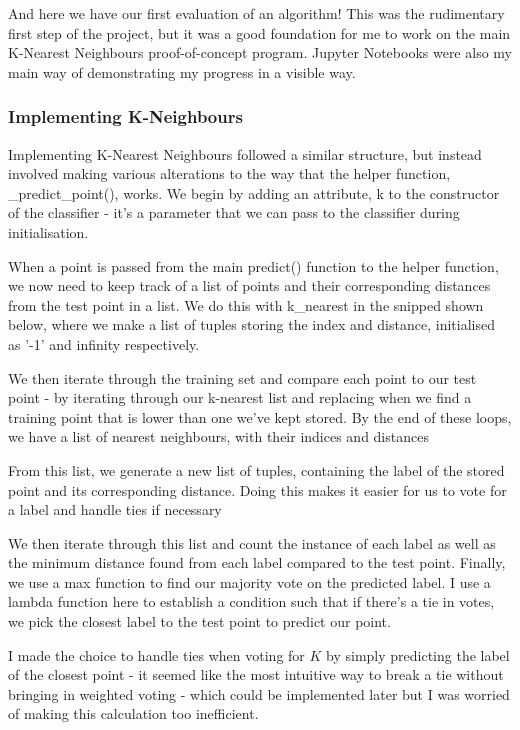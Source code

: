 \documentclass[letterpaper,10pt]{article}
\begin{document}
And here we have our first evaluation of an algorithm! This was the rudimentary first step of the project, but it was a good foundation for me to work on the main K-Nearest Neighbours proof-of-concept program. Jupyter Notebooks were also my main way of demonstrating my progress in a visible way. \par

\subsubsection{Implementing K-Neighbours}
Implementing K-Nearest Neighbours followed a similar structure, but instead involved making various alterations to the way that the helper function, \_predict\_point(), works. We begin by adding an attribute, k to the constructor of the classifier - it's a parameter that we can pass to the classifier during initialisation. \par
When a point is passed from the main predict() function to the helper function, we now need to keep track of a list of points and their corresponding distances from the test point in a list. We do this with k\_nearest in the snipped shown below, where we make a list of tuples storing the index and distance, initialised as '-1' and infinity respectively. \par
We then iterate through the training set and compare each point to our test point - by iterating through our k-nearest list and replacing when we find a training point that is lower than one we've kept stored. By the end of these loops, we have a list of nearest neighbours, with their indices and distances \par
From this list, we generate a new list of tuples, containing the label of the stored point and its corresponding distance. Doing this makes it easier for us to vote for a label and handle ties if necessary \par
We then iterate through this list and count the instance of each label as well as the minimum distance found from each label compared to the test point. Finally, we use a max function to find our majority vote on the predicted label. I use a lambda function here to establish a condition such that if there's a tie in votes, we pick the closest label to the test point to predict our point. \par
I made the choice to handle ties when voting for \(K\) by simply predicting the label of the closest point - it seemed like the most intuitive way to break a tie without bringing in weighted voting - which could be implemented later but I was worried of making this calculation too inefficient. \par
\end{document}
